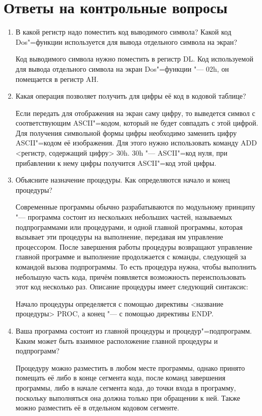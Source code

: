 \documentclass[bachelor, och, otchet]{SCWorks}
\begin{document}
\section{Ответы на контрольные вопросы}
\begin{enumerate}
\item В какой регистр надо поместить код выводимого символа? Какой код Dos"=функции используется для вывода отдельного символа на экран?

Код выводимого символа нужно поместить в регистр DL. Код используемой для вывода отдельного символа на экран Dos"=функции "--- 02h, он помещается в регистр AH.

\item Какая операция позволяет получить для цифры её код в кодовой таблице?

Если передать для отображения на экран саму цифру, то выведется символ с соответствующим ASCII"=кодом, который не будет совпадать с этой цифрой. Для получения символьной формы цифры необходимо заменить цифру ASCII"=кодом её изображения. Для этого нужно использовать команду ADD <регистр, содержащий цифру> 30h. 30h "--- ASCII"=код нуля, при прибавлении к нему цифры получится ASCII"=код этой цифры.

\item Объясните назначение процедуры. Как определяются начало и конец процедуры?

Современные программы обычно разрабатываются по модульному принципу "--- программа состоит из нескольких небольших частей, называемых подпрограммами или процедурами, и одной главной программы, которая вызывает эти процедуры на выполнение, передавая им управление процессором. После завершения работы процедуры возвращают управление главной программе и выполнение продолжается с команды, следующей за командой вызова подпрограммы. То есть процедура нужна, чтобы выполнить небольшую часть кода, причём появляется возможность переиспользовать этот код несколько раз. Описание процедуры имеет следующий синтаксис:



Начало процедуры определяется с помощью директивы <название процедуры> PROC, а конец "--- с помощью директивы ENDP.

\item Ваша программа состоит из главной процедуры и процедур"=подпрограмм. Каким может быть взаимное расположение главной процедуры и подпрограмм?

Процедуру можно разместить в любом месте программы, однако принято помещать её либо в конце сегмента кода, после команд завершения программы, либо в начале сегмента кода, до точки входа в программу, поскольку выполняться она должна только при обращении к ней. Также можно разместить её в отдельном кодовом сегменте.


\end{enumerate}
\end{document}
